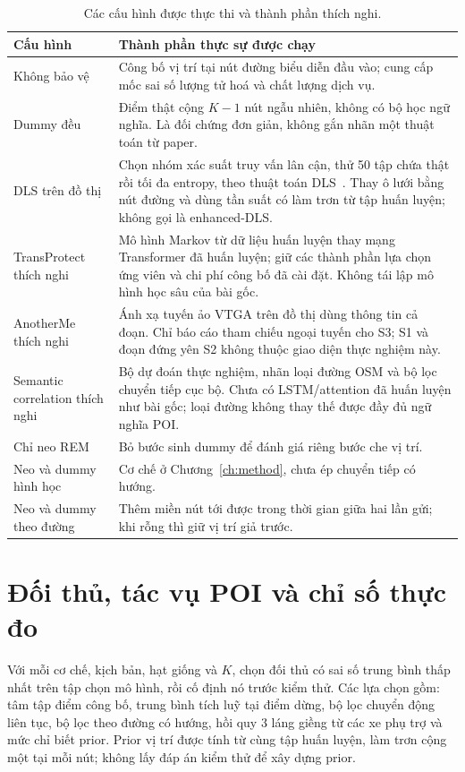 \begin{longtable}{p{}p{}}
\caption{Các cấu hình được thực thi và thành phần thích nghi.}\\
\toprule
\textbf{Cấu hình} & \textbf{Thành phần thực sự được chạy}\\
\midrule\endhead
Không bảo vệ & Công bố vị trí tại nút đường biểu diễn đầu vào; cung cấp mốc sai số lượng tử hoá và chất lượng dịch vụ.\\
Dummy đều & Điểm thật cộng $K-1$ nút ngẫu nhiên, không có bộ học ngữ nghĩa. Là đối chứng đơn giản, không gắn nhãn một thuật toán từ paper.\\
DLS trên đồ thị & Chọn nhóm xác suất truy vấn lân cận, thử 50 tập chứa thật rồi tối đa entropy, theo thuật toán DLS~\cite{niu2014dls}. Thay ô lưới bằng nút đường và dùng tần suất có làm trơn từ tập huấn luyện; không gọi là enhanced-DLS.\\
TransProtect thích nghi & Mô hình Markov từ dữ liệu huấn luyện thay mạng Transformer đã huấn luyện; giữ các thành phần lựa chọn ứng viên và chi phí công bố đã cài đặt. Không tái lập mô hình học sâu của bài gốc.\\
AnotherMe thích nghi & Ánh xạ tuyến ảo VTGA trên đồ thị dùng thông tin cả đoạn. Chỉ báo cáo tham chiếu ngoại tuyến cho S3; S1 và đoạn đứng yên S2 không thuộc giao diện thực nghiệm này.\\
Semantic correlation thích nghi & Bộ dự đoán thực nghiệm, nhãn loại đường OSM và bộ lọc chuyển tiếp cục bộ. Chưa có LSTM/attention đã huấn luyện như bài gốc; loại đường không thay thế được đầy đủ ngữ nghĩa POI.\\
Chỉ neo REM & Bỏ bước sinh dummy để đánh giá riêng bước che vị trí.\\
Neo và dummy hình học & Cơ chế ở Chương~\ref{ch:method}, chưa ép chuyển tiếp có hướng.\\
Neo và dummy theo đường & Thêm miền nút tới được trong thời gian giữa hai lần gửi; khi rỗng thì giữ vị trí giả trước.\\
\bottomrule
\end{longtable}

\section{Đối thủ, tác vụ POI và chỉ số thực đo}

Với mỗi cơ chế, kịch bản, hạt giống và $K$, chọn đối thủ có sai số trung bình thấp nhất trên tập chọn mô hình, rồi cố định nó trước kiểm thử. Các lựa chọn gồm: tâm tập điểm công bố, trung bình tích luỹ tại điểm dừng, bộ lọc chuyển động liên tục, bộ lọc theo đường có hướng, hồi quy 3 láng giềng từ các xe phụ trợ và mức chỉ biết prior. Prior vị trí được tính từ cùng tập huấn luyện, làm trơn cộng một tại mỗi nút; không lấy đáp án kiểm thử để xây dựng prior.

